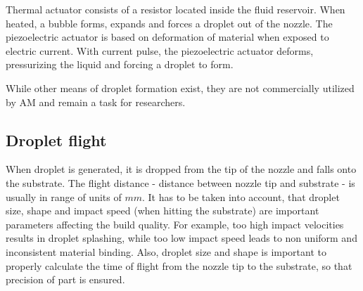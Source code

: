 \documentclass[a4paper, 11pt, reqno]{report}
\begin{document}
	Thermal actuator consists of a resistor located inside the fluid reservoir. When heated, a bubble forms, expands and forces a droplet out of the nozzle. The piezoelectric actuator is based on deformation of material when exposed to electric current. With current pulse, the piezoelectric actuator deforms, pressurizing the liquid and forcing a droplet to form.

	While other means of droplet formation exist, they are not commercially utilized by AM and remain a task for researchers.

\subsection{Droplet flight}
When droplet is generated, it is dropped from the tip of the nozzle and falls onto the substrate. The flight distance - distance between nozzle tip and substrate - is usually in range of units of $mm$. It has to be taken into account, that droplet size, shape and impact speed (when hitting the substrate) are important parameters affecting the build quality. For example, too high impact velocities results in droplet splashing, while too low impact speed leads to non uniform and inconsistent material binding. Also, droplet size and shape is important to properly calculate the time of flight from the nozzle tip to the substrate, so that precision of part is ensured.

\clearpage
\end{document}
